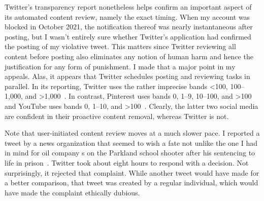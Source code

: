 Twitter's transparency report nonetheless helps confirm an important aspect of
its automated content review, namely the exact timing. When my account was
blocked in October 2021, the notification thereof was nearly instantaneous after
posting, but I wasn't entirely sure whether Twitter's application had confirmed
the posting of my violative tweet. This matters since Twitter reviewing all
content before posting also eliminates any notion of human harm and hence the
justification for any form of punishment. I made that a major point in my
appeals. Alas, it appears that Twitter schedules posting and reviewing tasks in
parallel. In its reporting, Twitter uses the rather imprecise bands <100,
100--1,000, and >1,000~\cite{Twitter}. In contrast, Pinterest uses bands 0,
1--9, 10--100, and >100~\cite{Pinterest2022} and YouTube uses bands 0, 1--10,
and >100~\cite{GoogleTransparencyReport}. Clearly, the latter two social media
are confident in their proactive content removal, whereas Twitter is not.

Note that user-initiated content review moves at a much slower pace. I reported
a tweet by a news organization that seemed to wish a fate not unlike the one I
had in mind for oil company \CEO{}s on the Parkland school shooter after his
sentencing to life in prison~\cite{ShapiroDeliso2022}. Twitter took about eight
hours to respond with a decision. Not surprisingly, it rejected that complaint.
While another tweet would have made for a better comparison, that tweet was
created by a regular individual, which would have made the complaint ethically
dubious.



